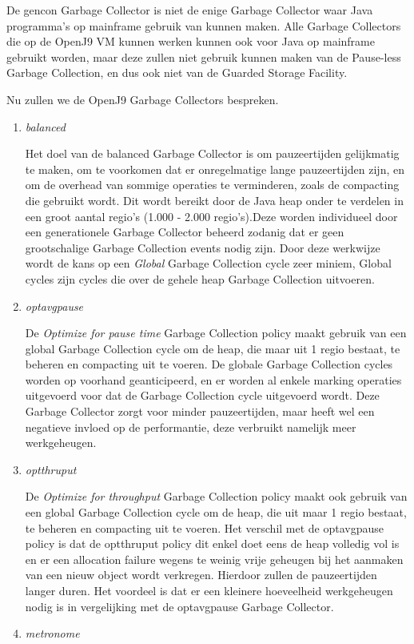 De gencon Garbage Collector is niet de enige Garbage Collector waar Java programma's op mainframe gebruik van kunnen maken.
Alle Garbage Collectors die op de OpenJ9 VM kunnen werken kunnen ook voor Java op mainframe gebruikt worden, maar deze zullen niet gebruik kunnen maken van de Pause-less Garbage Collection, en dus ook niet van de Guarded Storage Facility.


Nu zullen we de OpenJ9 Garbage Collectors bespreken.

\begin{enumerate}
    \item \textit{balanced}
    
            Het doel van de balanced Garbage Collector is om pauzeertijden gelijkmatig te maken, om te voorkomen dat er onregelmatige lange pauzeertijden zijn, en om de overhead van sommige operaties te verminderen, zoals de compacting die gebruikt wordt.
            Dit wordt bereikt door de Java heap onder te verdelen in een groot aantal regio's (1.000 - 2.000 regio's).Deze worden individueel door een generationele Garbage Collector beheerd zodanig dat er geen grootschalige Garbage Collection events nodig zijn.
            Door deze werkwijze wordt de kans op een \textit{Global} Garbage Collection cycle zeer miniem, Global cycles zijn cycles die over de gehele heap Garbage Collection uitvoeren.


    \item \textit{optavgpause}   
    
            De \textit{Optimize for pause time} Garbage Collection policy maakt gebruik van een global Garbage Collection cycle om de heap, die maar uit 1 regio bestaat, te beheren en compacting uit te voeren.
            De globale Garbage Collection cycles worden op voorhand geanticipeerd, en er worden al enkele marking operaties uitgevoerd voor dat de Garbage Collection cycle uitgevoerd wordt.
            Deze Garbage Collector zorgt voor minder pauzeertijden, maar heeft wel een negatieve invloed op de performantie, deze verbruikt namelijk meer werkgeheugen.

    \item \textit{optthruput}
    
            De \textit{Optimize for throughput} Garbage Collection policy maakt ook gebruik van een global Garbage Collection cycle om de heap, die uit maar 1 regio bestaat, te beheren en compacting uit te voeren.
            Het verschil met de optavgpause policy is dat de optthruput policy dit enkel doet eens de heap volledig vol is en er een allocation failure wegens te weinig vrije geheugen bij het aanmaken van een nieuw object wordt verkregen.
            Hierdoor zullen de pauzeertijden langer duren.
            Het voordeel is dat er een kleinere hoeveelheid werkgeheugen nodig is in vergelijking met de optavgpause Garbage Collector.
    \item \textit{metronome}
    

\end{enumerate}
